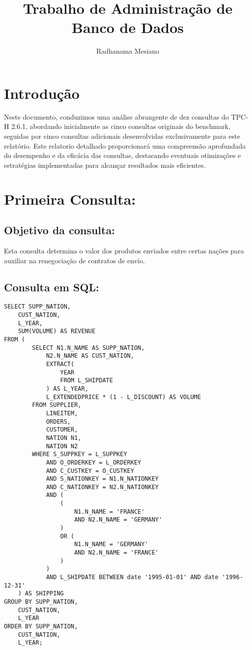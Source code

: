 \documentclass[12pt]{article}
\title{Trabalho de Administração de Banco de Dados}
\author{Radhanama Mesiano\inst{1}}
\begin{document}
\begin{landscape}
\maketitle

\section*{Introdução}
Neste documento, conduzimos uma análise abrangente de dez consultas do TPC-H 2.6.1, abordando inicialmente as cinco consultas originais do benchmark, seguidas por cinco consultas adicionais desenvolvidas exclusivamente para este relatório. Este relatorio detalhado proporcionará uma compreensão aprofundada do desempenho e da eficácia das consultas, destacando eventuais otimizações e estratégias implementadas para alcançar resultados mais eficientes.
\section{Primeira Consulta:}


\subsection{Objetivo da consulta:}
Esta consulta determina o valor dos produtos enviados entre certas nações para auxiliar na renegociação de contratos de envio.

\subsection{Consulta em SQL:}
\begin{lstlisting}
SELECT SUPP_NATION,
	CUST_NATION,
	L_YEAR,
	SUM(VOLUME) AS REVENUE
FROM (
		SELECT N1.N_NAME AS SUPP_NATION,
			N2.N_NAME AS CUST_NATION,
			EXTRACT(
				YEAR
				FROM L_SHIPDATE
			) AS L_YEAR,
			L_EXTENDEDPRICE * (1 - L_DISCOUNT) AS VOLUME
		FROM SUPPLIER,
			LINEITEM,
			ORDERS,
			CUSTOMER,
			NATION N1,
			NATION N2
		WHERE S_SUPPKEY = L_SUPPKEY
			AND O_ORDERKEY = L_ORDERKEY
			AND C_CUSTKEY = O_CUSTKEY
			AND S_NATIONKEY = N1.N_NATIONKEY
			AND C_NATIONKEY = N2.N_NATIONKEY
			AND (
				(
					N1.N_NAME = 'FRANCE'
					AND N2.N_NAME = 'GERMANY'
				)
				OR (
					N1.N_NAME = 'GERMANY'
					AND N2.N_NAME = 'FRANCE'
				)
			)
			AND L_SHIPDATE BETWEEN date '1995-01-01' AND date '1996-12-31'
	) AS SHIPPING
GROUP BY SUPP_NATION,
	CUST_NATION,
	L_YEAR
ORDER BY SUPP_NATION,
	CUST_NATION,
	L_YEAR;
\end{lstlisting}

\end{landscape}
\end{document}
